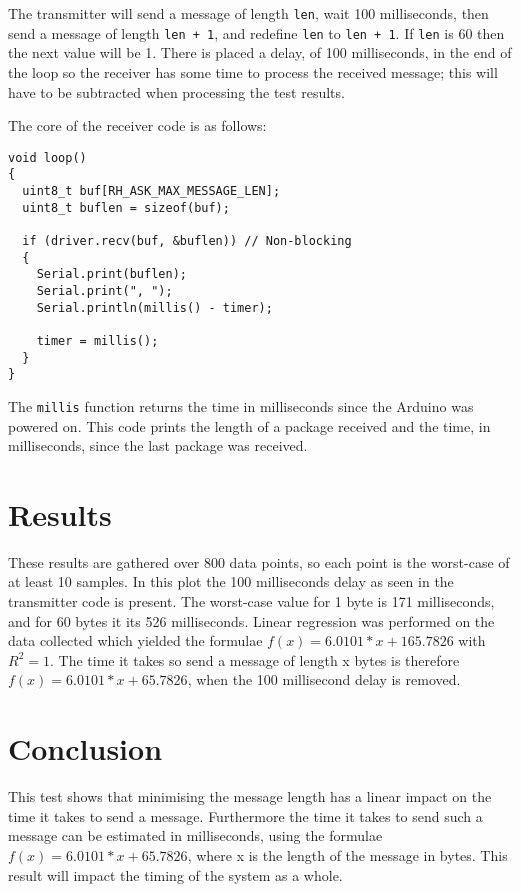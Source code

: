 The transmitter will send a message of length \texttt{len}, wait 100 milliseconds, then send a message of length \texttt{len + 1}, and redefine \texttt{len} to \texttt{len + 1}.
If \texttt{len} is 60 then the next value will be 1. 
There is placed a delay, of 100 milliseconds, in the end of the loop so the receiver has some time to process the received message; this will have to be subtracted when processing the test results.

The core of the receiver code is as follows: 
\begin{lstlisting}[style=customc]
void loop()
{
  uint8_t buf[RH_ASK_MAX_MESSAGE_LEN];
  uint8_t buflen = sizeof(buf);

  if (driver.recv(buf, &buflen)) // Non-blocking
  {
    Serial.print(buflen);
    Serial.print(", ");
    Serial.println(millis() - timer);
  
    timer = millis();
  }
}
\end{lstlisting}
The \texttt{millis} function returns the time in milliseconds since the Arduino was powered on. 
This code prints the length of a package received and the time, in milliseconds, since the last package was received.

\section*{Results}
\vspace {10 mm}
These results are gathered over 800 data points, so each point is the worst-case of at least 10 samples. 
In this plot the 100 milliseconds delay as seen in the transmitter code is present.
The worst-case value for 1 byte is 171 milliseconds, and for 60 bytes it its 526 milliseconds. 
Linear regression was performed on the data collected which yielded the formulae $f(x)=6.0101 * x + 165.7826$ with $R^2 = 1$. 
The time it takes so send a message of length x bytes is therefore $f(x)=6.0101 * x + 65.7826$, when the 100 millisecond delay is removed.

\section*{Conclusion}
This test shows that minimising the message length has a linear impact on the time it takes to send a message. 
Furthermore the time it takes to send such a message can be estimated in milliseconds, using the formulae $f(x)=6.0101 * x + 65.7826$, where x is the length of the message in bytes. 
This result will impact the timing of the system as a whole.  
